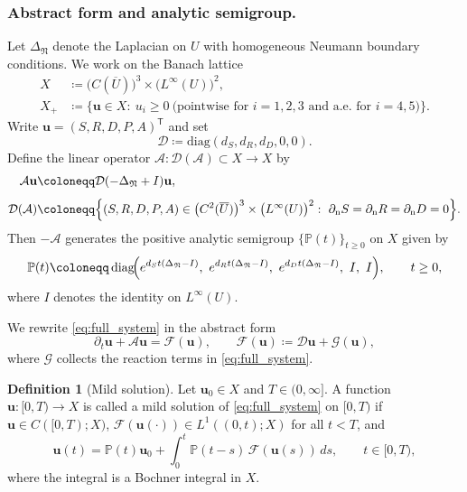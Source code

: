 \documentclass[pdflatex,sn-mathphys-ay]{sn-jnl}
\theoremstyle{thmstyleone}
\theoremstyle{definition}
\newtheorem{definition}[theorem]{Definition}
\theoremstyle{remark}
\begin{document}
\subsubsection{Abstract form and analytic semigroup.}
Let $\Delta_{\mathfrak N}$ denote
the Laplacian on $U$ with homogeneous Neumann boundary conditions.
We work on the Banach lattice
\begin{align*}
X &\coloneqq \bigl(C(\overline U)\bigr)^3 \times \bigl(L^\infty(U)\bigr)^2,
\\[6pt]
X_+ &\coloneqq \{\mathbf u\in X:\ u_i\ge 0\ \text{(pointwise for $i=1,2,3$ and a.e.\ for $i=4,5$)}\}.
\end{align*}
Write $\mathbf u=(S,R,D,P,A)^{\mathsf T}$ and set
\[
\mathcal D \coloneqq \mathrm{diag}(d_S,d_R,d_D,0,0).
\]
Define the linear operator $\mathcal A:\mathcal D(\mathcal A)\subset X\to X$ by
\begin{equation*}
\begin{aligned}
\mathcal A\mathbf u &\coloneqq \mathcal D(-\Delta_{\mathfrak N}+I)\mathbf u, \\[4pt]
\mathcal D(\mathcal A) &\coloneqq
\Bigl\{(S,R,D,P,A)\in \bigl(C^2(\overline U)\bigr)^3\times \bigl(L^\infty(U)\bigr)^2:
\ \partial_{\mathrm n}S=\partial_{\mathrm n}R=\partial_{\mathrm n}D=0\Bigr\}.
\end{aligned}
\end{equation*}
Then $-\mathcal A$ generates the positive analytic semigroup $\{\mathbb P(t)\}_{t\ge 0}$ on $X$ given by
\begin{equation}\label{eq:semigroup_def_shifted}
\mathbb P(t)\coloneqq
\operatorname{diag}\!\Bigl(e^{d_S t(\Delta_{\mathfrak N}-I)},\ e^{d_R t(\Delta_{\mathfrak N}-I)},\
e^{d_D t(\Delta_{\mathfrak N}-I)},\ I,\ I\Bigr),\qquad t\ge 0,
\end{equation}
where $I$ denotes the identity on $L^\infty(U)$.

We rewrite \eqref{eq:full_system} in the abstract form
\begin{equation}\label{eq:abstract_shifted}
\partial_t \mathbf u + \mathcal A \mathbf u = \mathcal F(\mathbf u),
\qquad
\mathcal F(\mathbf u)\coloneqq \mathcal D\mathbf u + \mathcal G(\mathbf u),
\end{equation}
where $\mathcal G$ collects the reaction terms in \eqref{eq:full_system}.

\begin{definition}[Mild solution]\label{def:mild_sol}
Let $\mathbf u_0\in X$ and $T\in(0,\infty]$.
A function $\mathbf u:[0,T)\to X$ is called a mild solution of \eqref{eq:full_system} on $[0,T)$ if
$\mathbf u\in C([0,T);X)$, $\mathcal F(\mathbf u(\cdot))\in L^1((0,t);X)$ for all
$t<T$, and
\begin{equation}\label{eq:mild_formula_shifted}
\mathbf u(t)=\mathbb P(t)\mathbf u_0 + \int_0^t \mathbb P(t-s)\,\mathcal F(\mathbf u(s))\,ds,
\qquad t\in[0,T),
\end{equation}
where the integral is a Bochner integral in $X$.
\end{definition}
\end{document}
